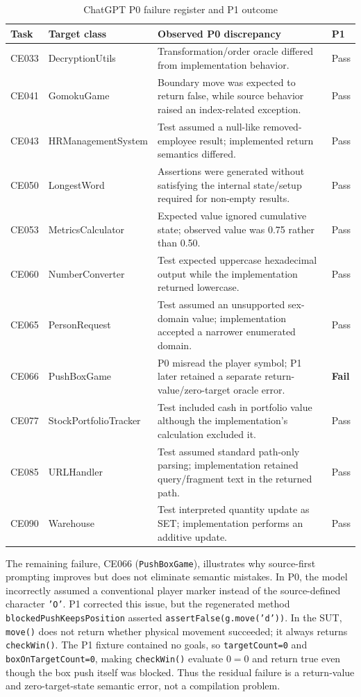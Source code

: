 \documentclass[conference]{IEEEtran}
\begin{document}
\begin{table}[t]
\caption{ChatGPT P0 failure register and P1 outcome}
\label{tab:chatgptfailures}
\centering
\scriptsize
\begin{tabularx}{\textwidth}{@{}l l X l@{}}
\toprule
Task & Target class & Observed P0 discrepancy & P1 \\
\midrule
CE033 & DecryptionUtils & Transformation/order oracle differed from implementation behavior. & Pass \\
CE041 & GomokuGame & Boundary move was expected to return false, while source behavior raised an index-related exception. & Pass \\
CE043 & HRManagementSystem & Test assumed a null-like removed-employee result; implemented return semantics differed. & Pass \\
CE050 & LongestWord & Assertions were generated without satisfying the internal state/setup required for non-empty results. & Pass \\
CE053 & MetricsCalculator & Expected value ignored cumulative state; observed value was 0.75 rather than 0.50. & Pass \\
CE060 & NumberConverter & Test expected uppercase hexadecimal output while the implementation returned lowercase. & Pass \\
CE065 & PersonRequest & Test assumed an unsupported sex-domain value; implementation accepted a narrower enumerated domain. & Pass \\
CE066 & PushBoxGame & P0 misread the player symbol; P1 later retained a separate return-value/zero-target oracle error. & \textbf{Fail} \\
CE077 & StockPortfolioTracker & Test included cash in portfolio value although the implementation's calculation excluded it. & Pass \\
CE085 & URLHandler & Test assumed standard path-only parsing; implementation retained query/fragment text in the returned path. & Pass \\
CE090 & Warehouse & Test interpreted quantity update as SET; implementation performs an additive update. & Pass \\
\bottomrule
\end{tabularx}
\end{table}

The remaining failure, CE066 (\texttt{PushBoxGame}), illustrates why source-first prompting improves but does not eliminate semantic mistakes. In P0, the model incorrectly assumed a conventional player marker instead of the source-defined character \texttt{'O'}. P1 corrected this issue, but the regenerated method \texttt{blockedPushKeepsPosition} asserted \texttt{assertFalse(g.move('d'))}. In the SUT, \texttt{move()} does not return whether physical movement succeeded; it always returns \texttt{checkWin()}. The P1 fixture contained no goals, so \texttt{targetCount=0} and \texttt{boxOnTargetCount=0}, making \texttt{checkWin()} evaluate $0=0$ and return true even though the box push itself was blocked. Thus the residual failure is a return-value and zero-target-state semantic error, not a compilation problem.
\end{document}

